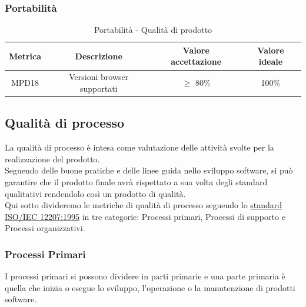 \documentclass[10pt]{article}
\begin{document}
\begin{justify}
\subsubsection{Portabilità}
\begin{table}[H]
  \centering
\begin{tabular}{|c|c|c|c|}
  \hline
  \textbf{Metrica} & \textbf{Descrizione} & \textbf{Valore accettazione} & \textbf{Valore ideale}\\
  \hline
  MPD18 & Versioni browser supportati & $\geq$ 80\% & 100\% \\
  \hline
\end{tabular}
\caption{Portabilità - Qualità di prodotto}
\label{tab:portabilità}
\end{table}


\subsection{Qualità di processo}
La qualità di processo è intesa come valutazione delle attività svolte per la realizzazione del prodotto.\\
Seguendo delle buone pratiche e delle linee guida nello sviluppo software, si può garantire che il prodotto finale avrà rispettato a sua volta degli standard qualitativi rendendolo così un prodotto di qualità.\\
Qui sotto divideremo le metriche di qualità di processo seguendo lo \hyperref[ISO 12207:1995]{standard ISO/IEC 12207:1995} in tre categorie: Processi primari, Processi di supporto e Processi organizzativi.\\
\subsubsection{Processi Primari}
I processi primari si possono dividere in parti primarie e una parte primaria è quella che inizia o esegue lo sviluppo, l'operazione o la manutenzione di prodotti software.\\


\end{justify}
\end{document}
